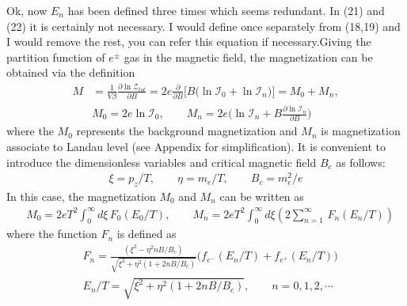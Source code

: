 \documentclass[sn-mathphys,Numbered]{sn-jnl}
\newcommand{\rev}[1]{{\color{blue}#1}}
\begin{document}
\rev{Ok, now $E_n$ has been defined three times which seems redundant. In (21) and (22) it is certainly not necessary. I would define once separately from (18,19) and I would remove the rest, you can refer this equation if necessary.}Giving the partition function of $e^\pm$ gas in the magnetic field, the magnetization can be obtained via the definition
\begin{align}
M&=\frac{1}{V\beta}\frac{\partial \ln \mathcal{Z}_{tot}}{\partial B}=2e\frac{\partial}{\partial B}\bigg[B\bigg(\ln\mathcal{I}_{0}+\ln\mathcal{I}_{n}\bigg)\bigg]=M_0+M_n,\\
&M_0=2e\ln\mathcal{I}_{0},\qquad
\label{M_landau}
M_n=2e\bigg(\ln\mathcal{I}_{n}+B\frac{\partial\ln\mathcal{I}_n}{\partial B}\bigg)
\end{align}
where the $M_0$ represents the background magnetization  and $M_n$ is magnetization associate to Landau level (see Appendix for simplification). It is convenient to introduce the dimensionless variables and critical magnetic field $B_c$ as follows:
\begin{align}
\xi=p_z/T,\qquad \eta=m_e/T,\qquad B_c=m^2_e/e
\end{align}
In this case, the magnetization $M_0$ and $M_n$ can be written as
\begin{align}
&M_0=2eT^2\int_0^\infty\!\!d\xi\, F_0(E_0/T),\qquad M_n=2eT^2\int_{0}^\infty\!\!d\xi\left(2\sum_{n=1}^\infty\,F_n(E_n/T)\right)
\end{align}
where the function $F_n$ is defined as
\begin{align}
&F_n=\frac{(\xi^2-\eta^2nB/B_c)}{\sqrt{\xi^2+\eta^2\left(1+2nB/B_c\right)}}\bigg(f_{e^-}(E_n/T)+f_{e^+}(E_n/T)\bigg)\\
&E_n/T=\sqrt{\xi^2+\eta^2\left(1+2nB/B_c\right)},\qquad n=0,1,2,\cdots
\end{align}
\end{document}
